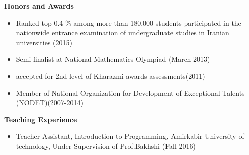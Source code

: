 \documentclass[a4paper,12pt,final]{memoir}
\newcommand{\Sep}{\vspace{1.5em}}
\newcommand{\SmallSep}{\vspace{0.5em}}
\newcommand{\CVSection}[1]
	{\Large\textbf{#1}\par
	\SmallSep\normalsize\normalfont}
\begin{document}
\CVSection{Honors and Awards}
\begin{itemize}
	\item Ranked top 0.4 \% among more than 180,000 students participated
in the nationwide entrance examination of undergraduate studies
in Iranian universities (2015) 
	\item Semi-finalist at National Mathematics Olympiad (March 2013)
	\item accepted for 2nd level of Kharazmi awards assessments(2011)
	\item Member of National Organization for Development of Exceptional  Talents (NODET)(2007-2014)
 
\end{itemize}

\Sep



\CVSection{Teaching Experience}
	\begin{itemize}
	\item  Teacher Assistant, Introduction to Programming, Amirkabir University of technology, Under Supervision of Prof.Bakhshi (Fall-2016)
	\end{itemize}
\Sep

\newpage
\normalsize\normalfont
\framebreak
\framebreak
\\
\end{document}
